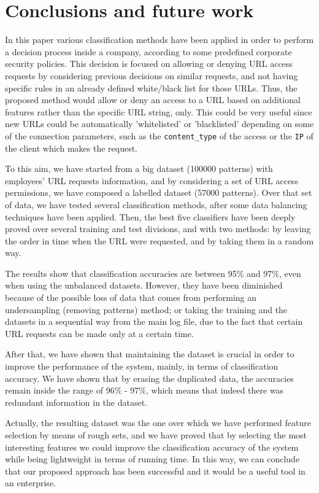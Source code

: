 \documentclass{llncs}
\begin{document}
\section{Conclusions and future work}
\label{sec:conclusions}
In this paper various classification methods have been applied in order to perform a decision process inside a company, 
according to some predefined corporate security policies. This decision is focused on allowing or denying URL access 
requests by considering previous decisions on similar requests, and not having specific rules in an already defined 
white/black list for those URLs. Thus, the proposed method would allow or deny an access to a URL based on additional 
features rather than the specific URL string, only. This could be very useful since new URLs could be 
automatically 'whitelisted' or 'blacklisted' depending on some of the connection parameters, 
such as the \texttt{content\_type} of the access or the \texttt{IP} of the client which makes the request.

To this aim, we have started from a big dataset (100000 patterns) with employees' URL requests information, 
and by considering a set of URL access permissions, we have composed a labelled dataset (57000 patterns). 
Over that set of data, we have tested several classification methods, after some data balancing techniques 
have been applied. Then, the best five classifiers have been deeply proved over several training and test divisions, 
and with two methods: by leaving the order in time when the URL were requested, and by taking them in a random way.

The results show that classification accuracies are between 95\% and 97\%, even when using the unbalanced datasets. 
However, they have been diminished because of the possible loss of data that comes from performing an undersampling 
(removing patterns) method; or taking the training and the datasets in a sequential way from the main log file, 
due to the fact that certain URL requests can be made only at a certain time.

After that, we have shown that maintaining the dataset is crucial in order to improve the performance of 
the system, mainly, in terms of classification accuracy. We have shown that by erasing the duplicated data, 
the accuracies remain inside the range of 96\% - 97\%, which means that indeed there was redundant information 
in the dataset.

Actually, the resulting dataset was the one over which we have performed feature selection by means of rough sets, 
and we have proved that by selecting the most interesting features we could improve the classification accuracy of 
the system while being lightweight in terms of running time. In this way, we can conclude that our proposed approach 
has been successful and it would be a useful tool in an enterprise.
\end{document}

